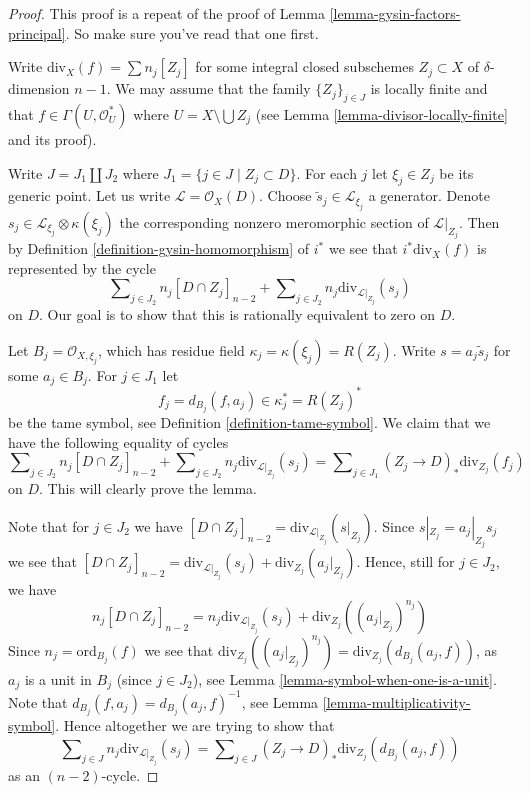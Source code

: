 \begin{proof}
This proof is a repeat of the proof of
Lemma \ref{lemma-gysin-factors-principal}.
So make sure you've read that one first.

\medskip\noindent
Write $\text{div}_X(f) = \sum n_j[Z_j]$ for some integral
closed subschemes $Z_j \subset X$ of $\delta$-dimension $n - 1$.
We may assume that the family $\{Z_j\}_{j \in J}$ is locally
finite and that $f \in \Gamma(U, \mathcal{O}_U^*)$
where $U = X \setminus \bigcup Z_j$ (see
Lemma \ref{lemma-divisor-locally-finite} and its proof).

\medskip\noindent
Write $J = J_1 \coprod J_2$ where $J_1 = \{j \in J \mid Z_j \subset D\}$.
For each $j$ let $\xi_j \in Z_j$ be its generic point.
Let us write $\mathcal{L} = \mathcal{O}_X(D)$.
Choose $\tilde s_j \in \mathcal{L}_{\xi_j}$ a generator.
Denote $s_j \in \mathcal{L}_{\xi_j} \otimes \kappa(\xi_j)$
the corresponding nonzero meromorphic section of
$\mathcal{L}|_{Z_j}$. Then by
Definition \ref{definition-gysin-homomorphism}
of $i^*$ we see that $i^*\text{div}_X(f)$ is represented
by the cycle
$$
\sum\nolimits_{j \in J_2} n_j[D \cap Z_j]_{n - 2}
+
\sum\nolimits_{j \in J_2} n_j \text{div}_{\mathcal{L}|_{Z_j}}(s_j)
$$
on $D$. Our goal is to show that this is rationally equivalent to zero
on $D$.

\medskip\noindent
Let $B_j = \mathcal{O}_{X, \xi_j}$, which has
residue field $\kappa_j = \kappa(\xi_j) = R(Z_j)$.
Write $s = a_j \tilde s_j$ for some $a_j \in B_j$.
For $j \in J_1$ let
$$
f_j = d_{B_j}(f, a_j) \in \kappa_j^* = R(Z_j)^*
$$
be the tame symbol, see Definition \ref{definition-tame-symbol}.
We claim that we have the following equality of cycles
$$
\sum\nolimits_{j \in J_2} n_j[D \cap Z_j]_{n - 2}
+
\sum\nolimits_{j \in J_2} n_j \text{div}_{\mathcal{L}|_{Z_j}}(s_j)
=
\sum\nolimits_{j \in J_1}
(Z_j \to D)_*\text{div}_{Z_j}(f_j)
$$
on $D$. This will clearly prove the lemma.

\medskip\noindent
Note that for $j\in J_2$ we have
$[D \cap Z_j]_{n - 2} = \text{div}_{\mathcal{L}|_{Z_j}}(s|_{Z_j})$.
Since $s|_{Z_j} = a_j|_{Z_j} s_j$ we see that
$[D \cap Z_j]_{n - 2} =
\text{div}_{\mathcal{L}|_{Z_j}}(s_j) + \text{div}_{Z_j}(a_j|_{Z_j})$.
Hence, still for $j \in J_2$, we have
$$
n_j[D \cap Z_j]_{n - 2} =
n_j \text{div}_{\mathcal{L}|_{Z_j}}(s_j) +
\text{div}_{Z_j}((a_j|_{Z_j})^{n_j})
$$
Since $n_j = \text{ord}_{B_j}(f)$ we see that
$\text{div}_{Z_j}((a_j|_{Z_j})^{n_j}) = \text{div}_{Z_j}(d_{B_j}(a_j, f))$,
as $a_j$ is a unit in $B_j$ (since $j \in J_2$),
see Lemma \ref{lemma-symbol-when-one-is-a-unit}.
Note that $d_{B_j}(f, a_j) = d_{B_j}(a_j, f)^{-1}$, see
Lemma \ref{lemma-multiplicativity-symbol}.
Hence altogether we are trying to show that
\begin{equation}
\label{equation-to-prove}
\sum\nolimits_{j \in J}
n_j \text{div}_{\mathcal{L}|_{Z_j}}(s_j)
=
\sum\nolimits_{j \in J}
(Z_j \to D)_*\text{div}_{Z_j}(d_{B_j}(a_j, f))
\end{equation}
as an $(n - 2)$-cycle.


\end{proof}
